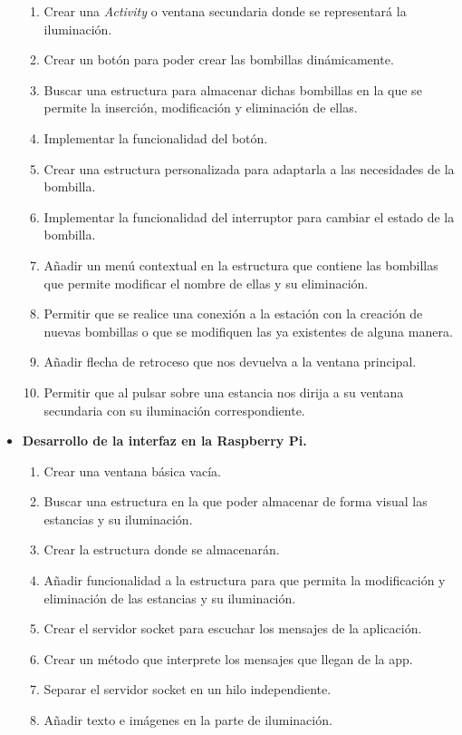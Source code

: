 \begin{itemize}
	\begin{enumerate}
		\item Crear una \textit{Activity} o ventana secundaria donde se representará la iluminación.
		\item Crear un botón para poder crear las bombillas dinámicamente.
		\item Buscar una estructura para almacenar dichas bombillas en la que se permite la inserción, modificación y eliminación de ellas.
		\item Implementar la funcionalidad del botón.
		\item Crear una estructura personalizada para adaptarla a las necesidades de la bombilla.
		\item Implementar la funcionalidad del interruptor para cambiar el estado de la bombilla.
		\item Añadir un menú contextual en la estructura que contiene las bombillas que permite modificar el nombre de ellas y su eliminación.
		\item Permitir que se realice una conexión a la estación con la creación de nuevas bombillas o que se modifiquen las ya existentes de alguna manera.
		\item Añadir flecha de retroceso que nos devuelva a la ventana principal.
		\item Permitir que al pulsar sobre una estancia nos dirija a su ventana secundaria con su iluminación correspondiente.
	\end{enumerate}
	\item \textbf{Desarrollo de la interfaz en la Raspberry Pi.}
	\begin{enumerate}
		\item Crear una ventana básica vacía.
		\item Buscar una estructura en la que poder almacenar de forma visual las estancias y su iluminación.
		\item Crear la estructura donde se almacenarán.
		\item Añadir funcionalidad a la estructura para que permita la modificación y eliminación de las estancias y su iluminación.
		\item Crear el servidor socket para escuchar los mensajes de la aplicación.
		\item Crear un método que interprete los mensajes que llegan de la app.
		\item Separar el servidor socket en un hilo independiente.
		\item Añadir texto e imágenes en la parte de iluminación.

\end{enumerate}
\end{itemize}
